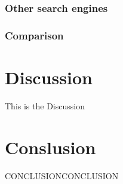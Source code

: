 \subsubsection{Other search engines}

\subsubsection{Comparison}

\section{Discussion}
\label{section:Discussion}
This is the Discussion

\section{Conslusion}
\label{section:Conclusion}
CONCLUSIONCONCLUSION



